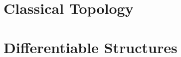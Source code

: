 % 
% 
% 


% 

\part{Classical Topology}




% 

\part{Differentiable Structures}

% 



\appendix

% 
% 
% 
% 

\printbibliography


